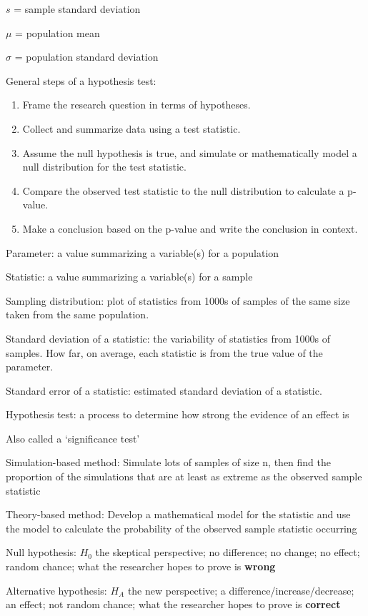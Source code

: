 \documentclass[
]{report}
\newcommand{\rgi}{\hspace{24pt}}  %
\begin{document}
\(s\) = sample standard deviation

\(\mu\) = population mean

\(\sigma\) = population standard deviation

General steps of a hypothesis test:

\begin{enumerate}
\def\labelenumi{\arabic{enumi}.}
\item
  Frame the research question in terms of hypotheses.
\item
  Collect and summarize data using a test statistic.
\item
  Assume the null hypothesis is true, and simulate or mathematically model a null distribution for the test statistic.
\item
  Compare the observed test statistic to the null distribution to calculate a p-value.
\item
  Make a conclusion based on the p-value and write the conclusion in context.
\end{enumerate}

Parameter: a value summarizing a variable(s) for a population

Statistic: a value summarizing a variable(s) for a sample

Sampling distribution: plot of statistics from 1000s of samples of the same size taken from the same population.

Standard deviation of a statistic: the variability of statistics from 1000s of samples. How far, on average, each statistic is from the true value of the parameter.

Standard error of a statistic: estimated standard deviation of a statistic.

Hypothesis test: a process to determine how strong the evidence of an effect is

\rgi Also called a `significance test'

Simulation-based method: Simulate lots of samples of size n, then find the proportion of the simulations that are at least as extreme as the observed sample statistic

Theory-based method: Develop a mathematical model for the statistic and use the model to calculate the probability of the observed sample statistic occurring

Null hypothesis: \(H_0\) the skeptical perspective; no difference; no change; no effect; random chance; what the researcher hopes to prove is \textbf{wrong}

Alternative hypothesis: \(H_A\) the new perspective; a difference/increase/decrease; an effect; not random chance; what the researcher hopes to prove is \textbf{correct}
\end{document}
